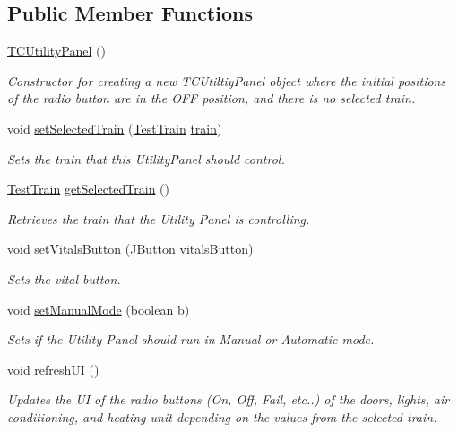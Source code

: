 \subsection*{Public Member Functions}
\begin{DoxyCompactItemize}
\item 
\hyperlink{classTrainControllerComps_1_1TCUtilityPanel_a0c7caafe2cb3719764e68cdb3e2b86b8}{T\+C\+Utility\+Panel} ()
\begin{DoxyCompactList}\small\item\em Constructor for creating a new T\+C\+Utiltiy\+Panel object where the initial positions of the radio button are in the \textquotesingle{}O\+FF\textquotesingle{} position, and there is no selected train. \end{DoxyCompactList}\item 
void \hyperlink{classTrainControllerComps_1_1TCUtilityPanel_aceae293b2d91b1f7d49518f1697b66d3}{set\+Selected\+Train} (\hyperlink{classTrainControllerComps_1_1TestTrain}{Test\+Train} \hyperlink{classtrain}{train})
\begin{DoxyCompactList}\small\item\em Sets the train that this Utility\+Panel should control. \end{DoxyCompactList}\item 
\hyperlink{classTrainControllerComps_1_1TestTrain}{Test\+Train} \hyperlink{classTrainControllerComps_1_1TCUtilityPanel_aa79861090681f39d2e15d9f35cc19114}{get\+Selected\+Train} ()
\begin{DoxyCompactList}\small\item\em Retrieves the train that the Utility Panel is controlling. \end{DoxyCompactList}\item 
void \hyperlink{classTrainControllerComps_1_1TCUtilityPanel_a3ec60489defa395e8f003d8f56ba4aab}{set\+Vitals\+Button} (J\+Button \hyperlink{classTrainControllerComps_1_1TCUtilityPanel_a8d0c793041cf07bd154325e0288bf7c6}{vitals\+Button})
\begin{DoxyCompactList}\small\item\em Sets the vital button. \end{DoxyCompactList}\item 
void \hyperlink{classTrainControllerComps_1_1TCUtilityPanel_a06c241551e5d282024843d8ae09bc6ba}{set\+Manual\+Mode} (boolean b)
\begin{DoxyCompactList}\small\item\em Sets if the Utility Panel should run in Manual or Automatic mode. \end{DoxyCompactList}\item 
void \hyperlink{classTrainControllerComps_1_1TCUtilityPanel_a5dd9a443969c62f13365769ef543014f}{refresh\+UI} ()
\begin{DoxyCompactList}\small\item\em Updates the UI of the radio buttons (On, Off, Fail, etc..) of the doors, lights, air conditioning, and heating unit depending on the values from the selected train. \end{DoxyCompactList}\end{DoxyCompactItemize}
